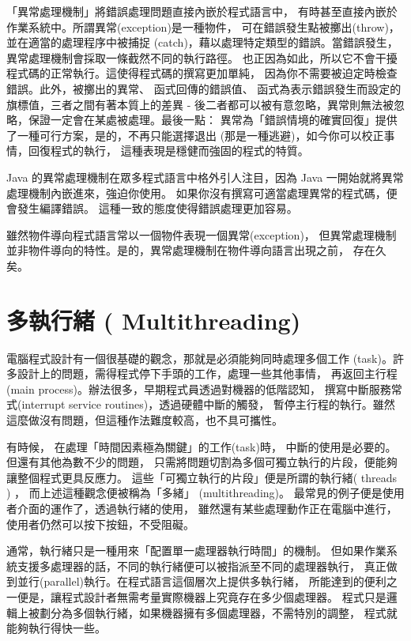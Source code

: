 「異常處理機制」將錯誤處理問題直接內嵌於程式語言中，
有時甚至直接內嵌於作業系統中。所謂異常(exception)是一種物件，
可在錯誤發生點被擲出(throw)，並在適當的處理程序中被捕捉
(catch)，藉以處理特定類型的錯誤。當錯誤發生，
異常處理機制會採取一條截然不同的執行路徑。
也正因為如此，所以它不會干擾程式碼的正常執行。這使得程式碼的撰寫更加單純，
因為你不需要被迫定時檢查錯誤。此外，被擲出的異常、 函式回傳的錯誤值、
函式為表示錯誤發生而設定的旗標值，三者之間有著本質上的差異 -
後二者都可以被有意忽略，異常則無法被忽略，保證一定會在某處被處理。最後一點：
異常為「錯誤情境的確實回復」提供了一種可行方案，是的，不再只能選擇退出
(那是一種逃避)，如今你可以校正事情，回復程式的執行，
這種表現是穩健而強固的程式的特質。

Java 的異常處理機制在眾多程式語言中格外引人注目，因為
Java 一開始就將異常處理機制內嵌進來，強迫你使用。
如果你沒有撰寫可適當處理異常的程式碼，便會發生編譯錯誤。
這種一致的態度使得錯誤處理更加容易。

雖然物件導向程式語言常以一個物件表現一個異常(exception)，
但異常處理機制並非物件導向的特性。是的，異常處理機制在物件導向語言出現之前，
存在久矣。
\section{多執行緒 ( Multithreading)}
電腦程式設計有一個很基礎的觀念，那就是必須能夠同時處理多個工作
(task)。許多設計上的問題，需得程式停下手頭的工作，處理一些其他事情，
再返回主行程(main process)。辦法很多，早期程式員透過對機器的低階認知，
撰寫中斷服務常式(interrupt service routines)，透過硬體中斷的觸發，
暫停主行程的執行。雖然這麼做沒有問題，但這種作法難度較高，也不具可攜性。

有時候， 在處理「時間因素極為關鍵」的工作(task)時，
中斷的使用是必要的。但還有其他為數不少的問題，
只需將問題切割為多個可獨立執行的片段，便能夠讓整個程式更具反應力。
這些「可獨立執行的片段」便是所謂的執行緒( threads ) ，
而上述這種觀念便被稱為「多緒」 (multithreading)。
最常見的例子便是使用者介面的運作了，透過執行緒的使用，
雖然還有某些處理動作正在電腦中進行，使用者仍然可以按下按鈕，不受阻礙。

通常，執行緒只是一種用來「配置單一處理器執行時間」的機制。
但如果作業系統支援多處理器的話，不同的執行緒便可以被指派至不同的處理器執行，
真正做到並行(parallel)執行。在程式語言這個層次上提供多執行緒，
所能達到的便利之一便是，讓程式設計者無需考量實際機器上究竟存在多少個處理器。
程式只是邏輯上被劃分為多個執行緒，如果機器擁有多個處理器，不需特別的調整，
程式就能夠執行得快一些。


